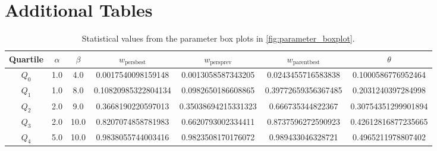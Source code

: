 \chapter{Additional Tables}
\label{chap:tables}

\begin{table}[h]
	\centering
	\caption{Statistical values from the parameter box plots in \cref{fig:parameter_boxplot}.}
	\label{tab:parameter_boxplot}
	\begin{tabular}{c | S[round-precision = 0]S[round-precision = 0]SSSS}
		\hline
		Quartile & $\alpha$ & $\beta$ & $w_{\text{persbest}}$ & $w_{\text{persprev}}$& $w_{\text{parentbest}}$ & $\theta$ \\ \hline
		$Q_0$ & 1.0 & 4.0 & 0.0017540098159148 & 0.0013058587343205 & 0.0243455716583838 & 0.1000586776952464 \\ 
		$Q_1$ & 1.0 & 8.0 & 0.10820985322804134 & 0.0982650186608865 & 0.39772659356367485 & 0.2031240397284998 \\ 
		$Q_2$ & 2.0 & 9.0 & 0.3668190220597013 & 0.35038694215331323 & 0.666735344822367 & 0.30754351299901894 \\ 
		$Q_3$ & 2.0 & 10.0 & 0.8207074858781983 & 0.6620793002334411 & 0.8737596272590923 & 0.42612816877235665 \\ 
		$Q_4$ & 5.0 & 10.0 & 0.9838055744003416 & 0.9823508170176072 & 0.989433046328721 & 0.4965211978807402 \\ \hline
	\end{tabular}
\end{table}

